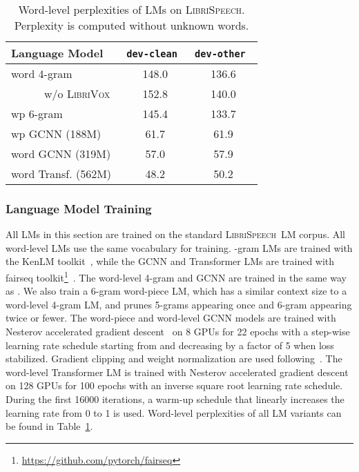 \documentclass{article}
\def\devclean{\texttt{dev-clean}}
\def\devother{\texttt{dev-other}}
\newcommand{\librivox}{\textsc{LibriVox}}
\newcommand{\librispeech}{\textsc{LibriSpeech}}
\begin{document}
\begin{table}[!t]
\caption{Word-level perplexities of LMs on \librispeech. Perplexity is computed without unknown words.\label{tab:libriPPL}}
\vskip 0.1in
\begin{center}
\begin{small}
\begin{sc}
\begin{tabular}{lcc}
    \toprule
        Language Model & \devclean~ & \devother~ \\
    \midrule
    word 4-gram & 148.0 & 136.6 \\
    ~~~~~~w/o \librivox~& 152.8 & 140.0 \\
    wp 6-gram & 145.4 & 133.7 \\
    wp GCNN (188M) & 61.7 & 61.9 \\
    word GCNN (319M) & 57.0 & 57.9 \\
    word Transf. (562M) & 48.2 & 50.2 \\
    \bottomrule
    \end{tabular}\end{sc}
\end{small}
\end{center}
\vskip -0.1in
\end{table}

\subsubsection{Language Model Training}
\label{sec:lmtraining}
All LMs in this section are trained on the standard \librispeech~LM corpus. All word-level LMs use the same vocabulary for training. -gram LMs are trained with the KenLM toolkit~\cite{heafield2011kenlm}, while the GCNN and Transformer LMs are trained with fairseq toolkit\footnote{\url{https://github.com/pytorch/fairseq}}~\cite{ott2019fairseq}. The word-level 4-gram and GCNN are trained in the same way as \cite{likhomanenko2019needs}. We also train a 6-gram word-piece LM, which has a similar context size to a word-level 4-gram LM, and prunes 5-grams appearing once and 6-gram appearing twice or fewer. The word-piece and word-level GCNN models are trained with Nesterov accelerated gradient descent~\cite{nesterov1983method} on 8 GPUs for 22 epochs with a step-wise learning rate schedule starting from  and decreasing by a factor of 5 when loss stabilized. Gradient clipping and weight normalization are used following~\cite{dauphin2017gcnn}.
The word-level Transformer LM is trained with Nesterov accelerated gradient descent on 128 GPUs for 100 epochs with an inverse square root learning rate schedule. During the first 16000 iterations, a warm-up schedule that linearly increases the learning rate from 0 to 1 is used. Word-level perplexities of all LM variants can be found in Table~\ref{tab:libriPPL}.
\end{document}
